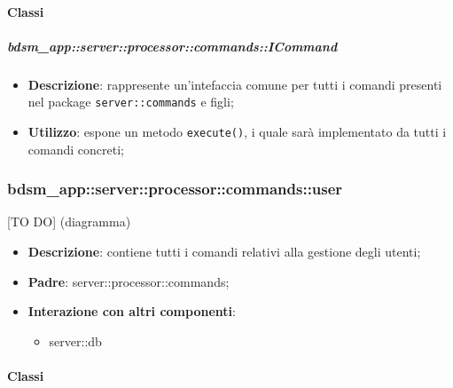       \paragraph{Classi} %

      \subparagraph{bdsm\_app::server::processor::commands::ICommand} %
      \label{subp:bdsm_app_server_processor_commands_icommand}
      \begin{itemize}
        \item \textbf{Descrizione}: rappresente un'intefaccia comune per tutti i comandi presenti nel package \texttt{server::commands} e figli;
        \item \textbf{Utilizzo}: espone un metodo \texttt{execute()}, i quale sarà implementato da tutti i comandi concreti;
      \end{itemize}


      \subsubsection{bdsm\_app::server::processor::commands::user} %
      \label{ssub:bdsm_app_server_processor_commands_user}
      [TO DO] (diagramma) \newline \newline

      \begin{itemize}
        \item \textbf{Descrizione}: contiene tutti i comandi relativi alla gestione degli utenti;
        \item \textbf{Padre}: server::processor::commands;
        \item \textbf{Interazione con altri componenti}:
          \begin{itemize}
            \item server::db
          \end{itemize}
      \end{itemize}

        \paragraph{Classi} %

